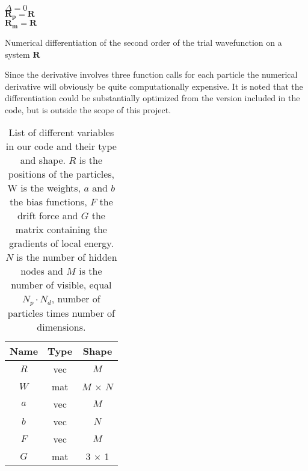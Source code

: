 \begin{algorithm}
\BlankLine
$\Delta = 0$ \\
$\mathbf{R_p} = \mathbf{R}$\\
$\mathbf{R_m} = \mathbf{R}$\\
\BlankLine
{}
\BlankLine
\caption{Numerical differentiation of the second order of the trial wavefunction on a system $\mathbf{R}$}\label{alg:nd}
\end{algorithm} 

Since the derivative involves three function calls for each particle the numerical derivative will obviously be quite computationally expensive. It is noted  that the differentiation could be substantially optimized from the version included in the code, but is outside the scope of this project. 

\begin{table}
    \centering
    \begin{tabular}{|c|c|c|}
    \hline
    Name   &  Type   &   Shape \\
    \hline
    $R$ & vec & $M$ \\
    $W$ & mat & $M$ $\times$ $N$ \\
    $a$ & vec & $M$ \\
    $b$ & vec & $N$ \\
    $F$ & vec & $M$ \\
    $G$ & mat & 3 $\times$ 1 \\
    \hline
    \end{tabular}
    \caption{List of different variables in our code and their type and shape. $R$ is the positions of the particles, W is the weights, $a$ and $b$ the bias functions, $F$ the drift force and $G$ the matrix containing the gradients of local energy. $N$ is the number of hidden nodes and $M$ is the number of visible, equal $N_p \cdot N_d$, number of particles times number of dimensions.}
    \label{tab:variables}
\end{table} 